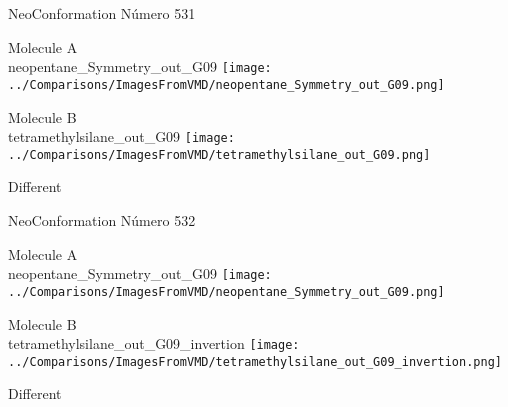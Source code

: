 \vtab[-3cm]
\begin{center}
{\large NeoConformation \tab Número 531}
\end{center}
\begin{multicols}{2}
\begin{center}
Molecule A \\ 
neopentane\_Symmetry\_out\_G09
\texttt{[image: ../Comparisons/ImagesFromVMD/neopentane\_Symmetry\_out\_G09.png]}
\\
\vtab

\columnbreak
Molecule B \\ 
tetramethylsilane\_out\_G09
\texttt{[image: ../Comparisons/ImagesFromVMD/tetramethylsilane\_out\_G09.png]}
\\
\vtab


\end{center}
\end{multicols}
\begin{center}
\textcolor{NavyBlue}{\Large Different}
\end{center}

 \newpage

\vtab[-3cm]
\begin{center}
{\large NeoConformation \tab Número 532}
\end{center}
\begin{multicols}{2}
\begin{center}
Molecule A \\ 
neopentane\_Symmetry\_out\_G09
\texttt{[image: ../Comparisons/ImagesFromVMD/neopentane\_Symmetry\_out\_G09.png]}
\\
\vtab

\columnbreak
Molecule B \\ 
tetramethylsilane\_out\_G09\_invertion
\texttt{[image: ../Comparisons/ImagesFromVMD/tetramethylsilane\_out\_G09\_invertion.png]}
\\
\vtab


\end{center}
\end{multicols}
\begin{center}
\textcolor{NavyBlue}{\Large Different}
\end{center}

 \newpage


